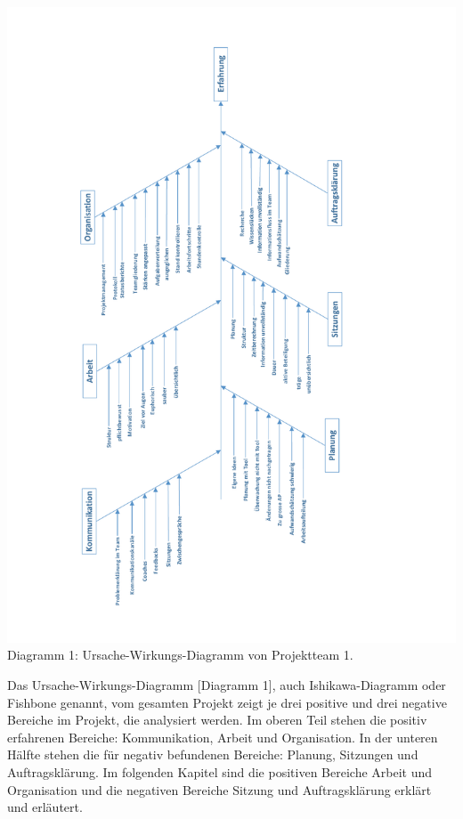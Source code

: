 
\begin{center}
\includegraphics[scale=0.75]{Visio-pmaFishbone}
\newline
Diagramm 1: Ursache-Wirkungs-Diagramm von Projektteam 1.
\end{center}

Das Ursache-Wirkungs-Diagramm [Diagramm 1], auch Ishikawa-Diagramm oder Fishbone genannt, vom gesamten Projekt zeigt je drei positive und drei negative Bereiche im Projekt, die analysiert werden. Im oberen Teil stehen die positiv erfahrenen Bereiche: Kommunikation, Arbeit und Organisation. In der unteren Hälfte stehen die für negativ befundenen Bereiche: Planung, Sitzungen und Auftragsklärung.
Im folgenden Kapitel sind die positiven Bereiche Arbeit und Organisation und die negativen Bereiche Sitzung und Auftragsklärung erklärt und erläutert.